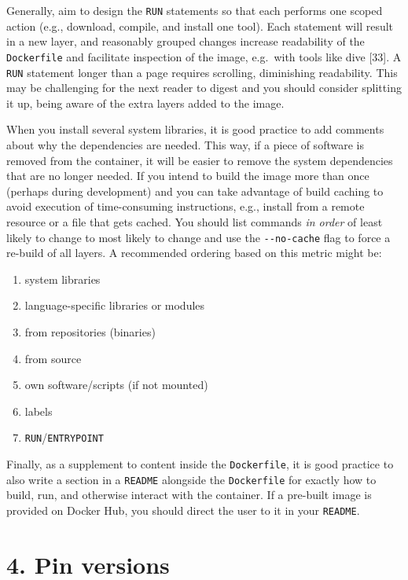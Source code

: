 \documentclass[10pt,letterpaper]{article}
\providecommand{\tightlist}{%
  \setlength{\itemsep}{0pt}\setlength{\parskip}{0pt}}
\begin{document}
Generally, aim to design the \texttt{RUN} statements so that each
performs one scoped action (e.g., download, compile, and install one
tool). Each statement will result in a new layer, and reasonably grouped
changes increase readability of the \texttt{Dockerfile} and facilitate
inspection of the image, e.g.~with tools like dive {[}33{]}. A
\texttt{RUN} statement longer than a page requires scrolling,
diminishing readability. This may be challenging for the next reader to
digest and you should consider splitting it up, being aware of the extra
layers added to the image.

When you install several system libraries, it is good practice to add
comments about why the dependencies are needed. This way, if a piece of
software is removed from the container, it will be easier to remove the
system dependencies that are no longer needed. If you intend to build
the image more than once (perhaps during development) and you can take
advantage of build caching to avoid execution of time-consuming
instructions, e.g., install from a remote resource or a file that gets
cached. You should list commands \emph{in order} of least likely to
change to most likely to change and use the \texttt{-\/-no-cache} flag
to force a re-build of all layers. A recommended ordering based on this
metric might be:

\begin{enumerate}
\def\labelenumi{\arabic{enumi}.}
\tightlist
\item
  system libraries
\item
  language-specific libraries or modules
\item
  from repositories (binaries)
\item
  from source
\item
  own software/scripts (if not mounted)
\item
  labels
\item
  \texttt{RUN}/\texttt{ENTRYPOINT}
\end{enumerate}

Finally, as a supplement to content inside the \texttt{Dockerfile}, it
is good practice to also write a section in a \texttt{README} alongside
the \texttt{Dockerfile} for exactly how to build, run, and otherwise
interact with the container. If a pre-built image is provided on Docker
Hub, you should direct the user to it in your \texttt{README}.

\hypertarget{pin-versions}{%
\section*{4. Pin versions}\label{pin-versions}}
\end{document}
